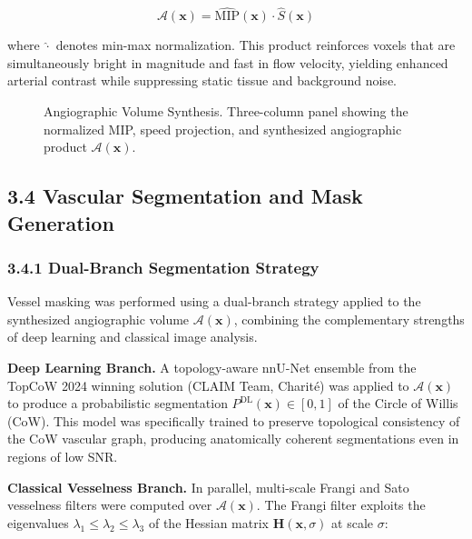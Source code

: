 \begin{equation}
    \mathcal{A}(\mathbf{x}) = \hat{\text{MIP}}(\mathbf{x}) \cdot \hat{S}(\mathbf{x})
\end{equation}

where $\hat{\cdot}$ denotes min-max normalization. This product reinforces voxels that are simultaneously bright in magnitude and fast in flow velocity, yielding enhanced arterial contrast while suppressing static tissue and background noise.

\begin{figure}[h]
    \centering
    \caption{Angiographic Volume Synthesis. Three-column panel showing the normalized MIP, speed projection, and synthesized angiographic product $\mathcal{A}(\mathbf{x})$.}
    \label{fig:angiographic}
\end{figure}

\subsection*{3.4 Vascular Segmentation and Mask Generation}

\subsubsection*{3.4.1 Dual-Branch Segmentation Strategy}

Vessel masking was performed using a dual-branch strategy applied to the synthesized angiographic volume $\mathcal{A}(\mathbf{x})$, combining the complementary strengths of deep learning and classical image analysis.

\textbf{Deep Learning Branch.} A topology-aware nnU-Net ensemble from the TopCoW 2024 winning solution (CLAIM Team, Charité) \cite{yang2023topcow,aydin2024topcow} was applied to $\mathcal{A}(\mathbf{x})$ to produce a probabilistic segmentation $P^{\text{DL}}(\mathbf{x}) \in [0,1]$ of the Circle of Willis (CoW). This model was specifically trained to preserve topological consistency of the CoW vascular graph, producing anatomically coherent segmentations even in regions of low SNR.

\textbf{Classical Vesselness Branch.} In parallel, multi-scale Frangi and Sato vesselness filters \cite{frangi1998,sato1998} were computed over $\mathcal{A}(\mathbf{x})$. The Frangi filter exploits the eigenvalues $\lambda_1 \leq \lambda_2 \leq \lambda_3$ of the Hessian matrix $\mathbf{H}(\mathbf{x}, \sigma)$ at scale $\sigma$:

